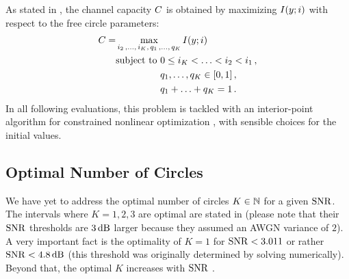 As stated in \cite{ShamaiTIT1995}, the channel capacity $C$ is obtained by maximizing $I(y;i)$ with respect to the free circle parameters:
\begin{align}
\RateMax = &\max_{\Radius_2\, , \ldots , \,\Radius_K, \,\CircProb_1\, , \ldots, \,\CircProb_K} \Rate
\label{eq:Capacity} \\
&\mathrm{subject\ to}\
0 \leq \Radius_K < \ldots < \Radius_2 < \Radius_1 \, , \nonumber\\
&\hphantom{\mathrm{subject\ to}}\
\CircProb_1 , \ldots , \CircProb_K \in [0,1] \, , \nonumber\\
&\hphantom{\mathrm{subject\ to}}\
\CircProb_1 + \ldots + \CircProb_K = 1 \, . \nonumber
\end{align}
In all following evaluations, this problem is tackled with an interior-point algorithm for constrained nonlinear optimization \cite{InteriorPointAlgorithm}, with sensible choices for the initial values.



\subsection{Optimal Number of Circles}
\label{sec:K}

We have yet to address the optimal number of circles $K \in \mathbb{N}$ for a given $\mathrm{SNR}$. The intervals where $K = 1,2,3$ are optimal are stated in \cite[Tab.~1]{ShamaiTIT1995} (please note that their $\mathrm{SNR}$ thresholds are $3\,\mathrm{dB}$ larger because they assumed an AWGN variance of $2$).
%
A very important fact is the optimality of $K = 1$ for $\mathrm{SNR} < 3.011$ or rather $\mathrm{SNR} < 4.8\,\mathrm{dB}$ (this threshold was originally determined by solving \cite[Eq.~(45)]{ShamaiTIT1995} numerically).
Beyond that, the optimal $K$ increases with $\mathrm{SNR}$ \cite{ShamaiTIT1995}.


